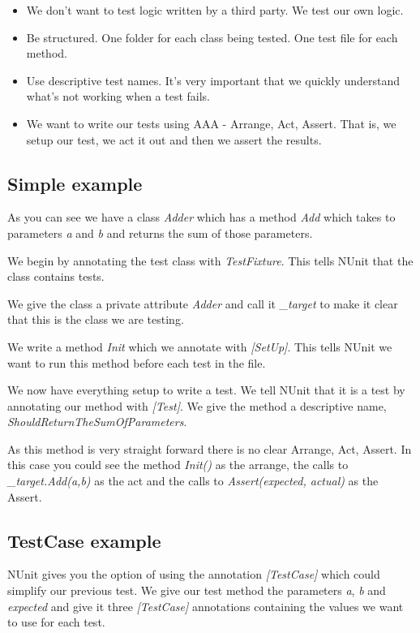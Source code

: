 \documentclass[12pt]{article}
\begin{document}
\begin{itemize}
	\item We don't want to test logic written by a third party. We test our own logic.
	\item Be structured. One folder for each class being tested. One test file for each method.
	\item Use descriptive test names. It's very important that we quickly understand what's not working when a test fails.
	\item We want to write our tests using AAA - Arrange, Act, Assert. That is, we setup our test, we act it out and then we assert the results.
\end{itemize}

\subsection{Simple example}


As you can see we have a class \emph{Adder} which has a method \emph{Add} which takes to parameters \emph{a} and \emph{b} and returns the sum of those parameters.

We begin by annotating the test class with \emph{TestFixture}. This tells NUnit that the class contains tests.

We give the class a private attribute \emph{Adder} and call it \emph{\_target} to make it clear that this is the class we are testing.

We write a method \emph{Init} which we annotate with \emph{[SetUp]}. This tells NUnit we want to run this method before each test in the file.

We now have everything setup to write a test. We tell NUnit that it is a test by annotating our method with \emph{[Test]}. We give the method a descriptive name, \emph{ShouldReturnTheSumOfParameters}.

As this method is very straight forward there is no clear Arrange, Act, Assert. In this case you could see the method \emph{Init()} as the arrange, the calls to \emph{\_target.Add(a,b)} as the act and the calls to \emph{Assert(expected, actual)} as the Assert.

\subsection{TestCase example}


NUnit gives you the option of using the annotation \emph{[TestCase]} which could simplify our previous test. We give our test method the parameters \emph{a}, \emph{b} and \emph{expected} and give it three \emph{[TestCase]} annotations containing the values we want to use for each test.
\end{document}
